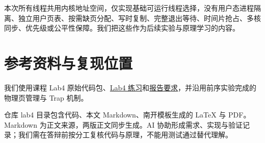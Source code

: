 \documentclass[UTF8,a4paper,10pt]{ctexart}
\begin{document}
本次所有线程共用内核地址空间，仅实现基础可运行线程选择，没有用户态进程隔离、独立用户页表、按需缺页分配、写时复制、完整退出等待、时间片抢占、多核同步、优先级或公平性保障。我们把这些作为后续实验与原理学习的内容。


\section{参考资料与复现位置}

我们使用课程 Lab4 原始代码包、\href{http://oslab.mobisys.top/lab2026/_book/lab4/lab4_2_1_exercises.html}{Lab4 练习}和\href{http://oslab.mobisys.top/lab2026/_book/lab4/lab4_5_labs_requirement.html}{报告要求}，并沿用前序实验完成的物理页管理与 Trap 机制。


仓库 lab4 目录包含代码、本文 Markdown、南开模板生成的 LaTeX 与 PDF。Markdown 为正文来源，两版正文同步生成。AI 协助形成需求、实现与验证记录；我们需在答辩前按分工复核代码与原理，不能用测试通过替代理解。
\end{document}
